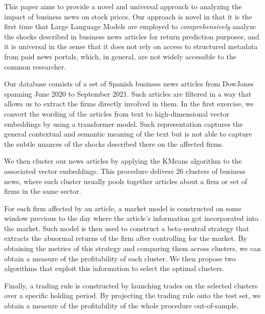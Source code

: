 
\hspace{0.5cm} This paper aims to provide a novel and universal approach to analyzing the impact of business news on stock prices. Our approach is novel in that it is the first time that Large Language Models are employed to \textit{comprehensively} analyze the shocks described in business news articles for return prediction purposes, and it is universal in the sense that it does not rely on access to structured metadata from paid news portals, which, in general, are not widely accessible to the common researcher.

\mx 
Our database consists of a set of Spanish business news articles from DowJones spanning June 2020 to September 2021. Such articles are filtered in a way that allows us to extract the firms directly involved in them. In the first exercise, we convert the wording of the articles from text to high-dimensional vector embeddings by using a transformer model. Such representation captures the general contextual and semantic meaning of the text but is not able to capture the subtle nuances of the shocks described there on the affected firms. 

\mx 
We then cluster our news articles by applying the KMeans algorithm to the associated vector embeddings. This procedure delivers 26 clusters of business news, where each cluster usually pools together articles about a firm or set of firms in the same sector. 

\mx 
For each firm affected by an article, a market model is constructed on some window previous to the day where the article's information got incorporated into the market. Such model is then used to construct a beta-neutral strategy that extracts the abnormal returns of the firm after controlling for the market. 
By obtaining the metrics of this strategy and comparing them across clusters, we can obtain a measure of the profitability of each cluster. We then propose two algorithms that exploit this information to select the optimal clusters.

\mx 
Finally, a trading rule is constructed by launching trades on the selected clusters over a specific holding period. By projecting the trading rule onto the test set, we obtain a measure of the profitability of the whole procedure out-of-sample. 


